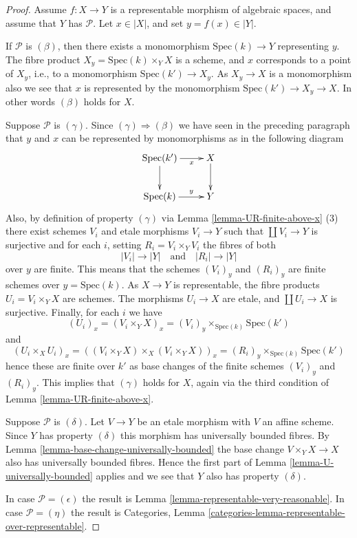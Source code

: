 \begin{proof}
Assume $f : X \to Y$ is a representable morphism of algebraic spaces,
and assume that $Y$ has $\mathcal{P}$. Let $x \in |X|$, and set
$y = f(x) \in |Y|$.

\medskip\noindent
If $\mathcal{P}$ is $(\beta)$, then there exists a monomorphism
$\text{Spec}(k) \to Y$ representing $y$. The fibre product
$X_y = \text{Spec}(k) \times_Y X$ is a scheme, and $x$ corresponds
to a point of $X_y$, i.e., to a monomorphism $\text{Spec}(k') \to X_y$.
As $X_y \to X$ is a monomorphism also we see that $x$ is represented
by the monomorphism $\text{Spec}(k') \to X_y \to X$. In other words
$(\beta)$ holds for $X$.

\medskip\noindent
Suppose $\mathcal{P}$ is $(\gamma)$. Since $(\gamma) \Rightarrow (\beta)$
we have seen in the preceding paragraph that $y$ and $x$ can be represented
by monomorphisms as in the following diagram
$$
\xymatrix{
\text{Spec}(k') \ar[r]_-x \ar[d] & X \ar[d] \\
\text{Spec}(k) \ar[r]^-y & Y
}
$$
Also, by definition of property $(\gamma)$ via
Lemma \ref{lemma-UR-finite-above-x} (3)
there exist schemes
$V_i$ and etale morphisms $V_i \to Y$ such that $\coprod V_i \to Y$
is surjective and for each $i$, setting $R_i = V_i \times_Y V_i$
the fibres of both
$$
|V_i| \longrightarrow |Y|
\quad\text{and}\quad
|R_i| \longrightarrow |Y|
$$
over $y$ are finite. This means that the schemes
$(V_i)_y$ and $(R_i)_y$ are finite schemes over $y = \text{Spec}(k)$.
As $X \to Y$ is representable, the fibre products $U_i = V_i \times_Y X$
are schemes. The morphisms $U_i \to X$ are etale, and
$\coprod U_i \to X$ is surjective. Finally, for each $i$ we have
$$
(U_i)_x =
(V_i \times_Y X)_x =
(V_i)_y \times_{\text{Spec}(k)} \text{Spec}(k')
$$
and
$$
(U_i \times_X U_i)_x =
\left((V_i \times_Y X) \times_X (V_i \times_Y X)\right)_x =
(R_i)_y \times_{\text{Spec}(k)} \text{Spec}(k')
$$
hence these are finite over $k'$ as base changes of the finite
schemes $(V_i)_y$ and $(R_i)_y$. This implies that $(\gamma)$ holds for $X$,
again via the third condition of
Lemma \ref{lemma-UR-finite-above-x}.

\medskip\noindent
Suppose $\mathcal{P}$ is $(\delta)$. Let $V \to Y$ be an etale morphism with
$V$ an affine scheme. Since $Y$ has property $(\delta)$ this morphism has
universally bounded fibres. By
Lemma \ref{lemma-base-change-universally-bounded}
the base change $V \times_Y X \to X$ also has universally bounded fibres.
Hence the first part of
Lemma \ref{lemma-U-universally-bounded}
applies and we see that $Y$ also has property $(\delta)$.

\medskip\noindent
In case $\mathcal{P} = (\epsilon)$ the result is
Lemma \ref{lemma-representable-very-reasonable}.
In case $\mathcal{P} = (\eta)$ the result is
Categories, Lemma \ref{categories-lemma-representable-over-representable}.
\end{proof}






